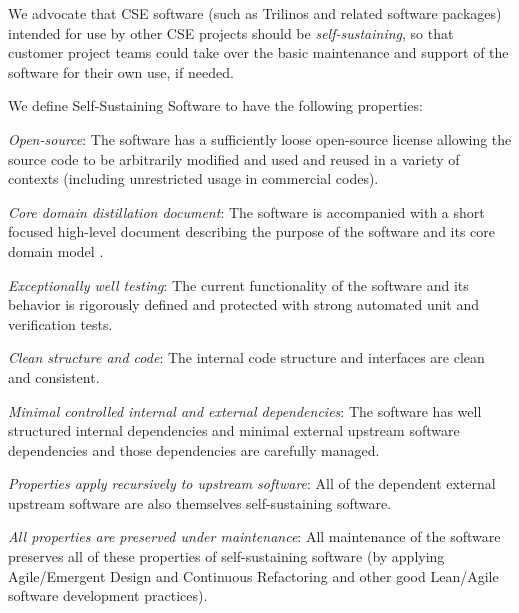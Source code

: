 \documentclass[11pt]{SANDreport}
\begin{document}
We advocate that CSE software (such as Trilinos and related software packages) intended for use by other CSE projects should be \textit{self-sustaining}, so that customer project teams could take over the basic maintenance and
support of the software for their own use, if needed.

We define Self-Sustaining Software to have the
following properties:
%
\begin{compactitem}

{}\item\textit{Open-source}: The software has a sufficiently loose
open-source license allowing the source code to be arbitrarily modified
and used and reused in a variety of contexts (including unrestricted
usage in commercial codes).

{}\item\textit{Core domain distillation document}: The software is
accompanied with a short focused high-level document describing the
purpose of the software and its core domain model
{}\cite{DomainDrivenDesign}.

{}\item\textit{Exceptionally well testing}: The current functionality
of the software and its behavior is rigorously defined and protected
with strong automated unit and verification tests.

{}\item\textit{Clean structure and code}: The internal code structure
and interfaces are clean and consistent.

{}\item\textit{Minimal controlled internal and external dependencies}:
The software has well structured internal dependencies and minimal
external upstream software dependencies and those dependencies are
carefully managed.

{}\item\textit{Properties apply recursively to upstream software}: All
of the dependent external upstream software are also themselves
self-sustaining software.

{}\item\textit{All properties are preserved under maintenance}: All
maintenance of the software preserves all of these properties of
self-sustaining software (by applying Agile/Emergent Design and
Continuous Refactoring and other good Lean/Agile software development
practices).

\end{compactitem}
\end{document}
